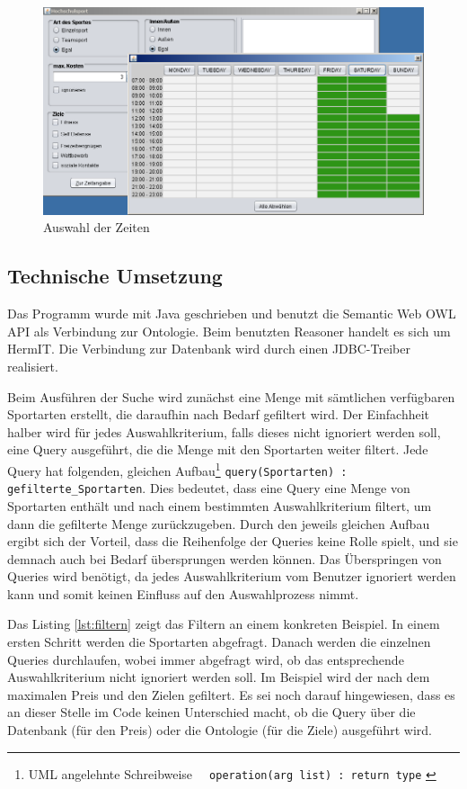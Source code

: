 \begin{figure}[p]
\centering
\includegraphics[width=\textwidth]{images/guizeit.png}%
\caption{Auswahl der Zeiten}
\label{fig:Auswahl der Zeiten}
\end{figure}
\newpage
\subsection{Technische Umsetzung}
Das Programm wurde mit Java geschrieben und benutzt die Semantic Web OWL API \autocite{semweb:owlapi} als Verbindung zur Ontologie. Beim benutzten Reasoner handelt es sich um HermIT\autocite{krr:hermit}. Die Verbindung zur Datenbank wird durch einen JDBC-Treiber\autocite{oracle:jdbc} realisiert.

Beim Ausführen der Suche wird zunächst eine Menge mit sämtlichen verfügbaren Sportarten erstellt, die daraufhin nach Bedarf gefiltert wird. Der Einfachheit halber wird für jedes Auswahlkriterium, falls dieses nicht ignoriert werden soll, eine Query ausgeführt, die die Menge mit den Sportarten weiter filtert. Jede Query hat folgenden, gleichen Aufbau\footnote{UML angelehnte Schreibweise \lstinline"  operation(arg list) : return type" \autocite{kow:umlclass}} \lstinline"query(Sportarten) : gefilterte_Sportarten". Dies bedeutet, dass eine Query eine Menge von Sportarten enthält und nach einem bestimmten Auswahlkriterium filtert, um dann die gefilterte Menge zurückzugeben. Durch den jeweils gleichen Aufbau ergibt sich der Vorteil, dass die Reihenfolge der Queries keine Rolle spielt, und sie demnach auch bei Bedarf übersprungen werden können. Das Überspringen von Queries wird benötigt, da jedes Auswahlkriterium vom Benutzer ignoriert werden kann und somit keinen Einfluss auf den Auswahlprozess nimmt.

Das Listing \ref{lst:filtern} zeigt das Filtern an einem konkreten Beispiel. In einem ersten Schritt werden die Sportarten abgefragt. Danach werden die einzelnen Queries durchlaufen, wobei immer abgefragt wird, ob das entsprechende Auswahlkriterium nicht ignoriert werden soll. Im Beispiel wird der nach dem maximalen Preis und den Zielen gefiltert. Es sei noch darauf hingewiesen, dass es an dieser Stelle im Code keinen Unterschied macht, ob die Query über die Datenbank (für den Preis) oder die Ontologie (für die Ziele) ausgeführt wird. 


